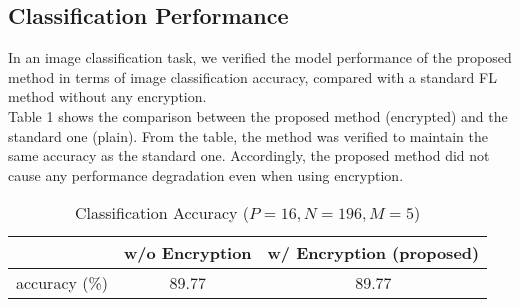 \documentclass[conference, a4paper]{IEEEtran}
\begin{document}
\subsection{Classification Performance}

In an image classification task, we verified the model performance of the proposed method in terms of image classification accuracy, compared with a standard FL method without any encryption. \\
\indent Table 1 shows the comparison between the proposed method (encrypted) and the standard one (plain). From the table, the method was verified to maintain the same accuracy as the standard one. Accordingly, the proposed method did not cause any performance degradation even when using encryption. 

\begin{table}[h]
  \centering
  \caption{Classification Accuracy ($P=16, N=196, M=5$)}
\begin{tabular}{c|cc}
   & w/o Encryption & w/ Encryption (proposed) \\
  \hline
   accuracy (\%) & 89.77 & 89.77 \\
\end{tabular}
\end{table}
\end{document}
